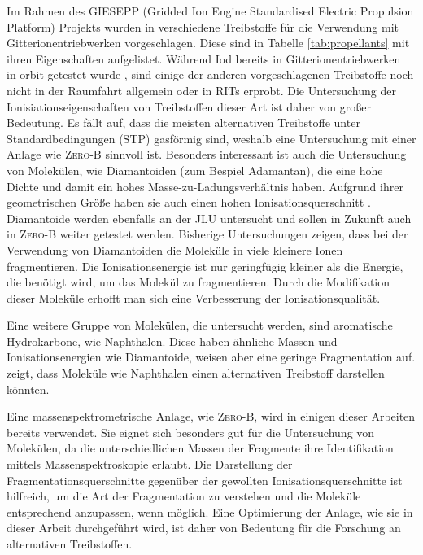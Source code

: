 Im Rahmen des GIESEPP (Gridded Ion Engine Standardised Electric Propulsion Platform) Projekts wurden in \cite{Prop} verschiedene Treibstoffe für die Verwendung mit Gitterionentriebwerken vorgeschlagen. Diese sind in Tabelle \ref{tab:propellants} mit ihren Eigenschaften aufgelistet. Während Iod bereits in Gitterionentriebwerken in-orbit getestet wurde \cite{Iodine}, sind einige der anderen vorgeschlagenen Treibstoffe noch nicht in der Raumfahrt allgemein oder in RITs erprobt. Die Untersuchung der Ionisiationseigenschaften von Treibstoffen dieser Art ist daher von großer Bedeutung. Es fällt auf, dass die meisten alternativen Treibstoffe unter Standardbedingungen (STP) gasförmig sind, weshalb eine Untersuchung mit einer Anlage wie \textsc{Zero-B} sinnvoll ist. Besonders interessant ist auch die Untersuchung von Molekülen, wie Diamantoiden (zum Bespiel Adamantan), die eine hohe Dichte und damit ein hohes Masse-zu-Ladungsverhältnis haben. Aufgrund ihrer geometrischen Größe haben sie auch einen hohen Ionisationsquerschnitt \cite{ion}. Diamantoide werden ebenfalls an der JLU untersucht \cite{diamondoids} und sollen in Zukunft auch in \textsc{Zero-B} weiter getestet werden. Bisherige Untersuchungen zeigen, dass bei der Verwendung von Diamantoiden die Moleküle in viele kleinere Ionen fragmentieren. Die Ionisationsenergie ist nur geringfügig kleiner als die Energie, die benötigt wird, um das Molekül zu fragmentieren. Durch die Modifikation dieser Moleküle erhofft man sich eine Verbesserung der Ionisationsqualität. 

Eine weitere Gruppe von Molekülen, die untersucht werden, sind aromatische Hydrokarbone, wie Naphthalen. Diese haben ähnliche Massen und Ionisationsenergien wie Diamantoide, weisen aber eine geringe Fragmentation auf. \cite{hydrocarbons} zeigt, dass Moleküle wie Naphthalen einen alternativen Treibstoff darstellen könnten.

Eine massenspektrometrische Anlage, wie \textsc{Zero-B}, wird in einigen dieser Arbeiten bereits verwendet. Sie eignet sich besonders gut für die Untersuchung von Molekülen, da die unterschiedlichen Massen der Fragmente ihre Identifikation mittels Massenspektroskopie erlaubt. Die Darstellung der Fragmentationsquerschnitte gegenüber der gewollten Ionisationsquerschnitte ist hilfreich, um die Art der Fragmentation zu verstehen und die Moleküle entsprechend anzupassen, wenn möglich. Eine Optimierung der Anlage, wie sie in dieser Arbeit durchgeführt wird, ist daher von Bedeutung für die Forschung an alternativen Treibstoffen.

